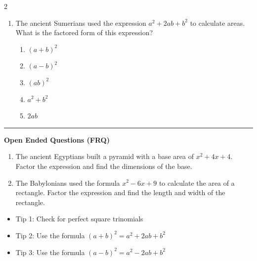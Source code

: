\documentclass[10pt]{article}
\begin{document}
\begin{multicols}{2}
\begin{enumerate}[label=\textbf{Q\arabic*.}, leftmargin=*, itemsep=6pt, parsep=0pt]
  \item \small The ancient Sumerians used the expression $a^2 + 2ab + b^2$ to calculate areas. What is the factored form of this expression?
  \begin{enumerate}[label=(\Alph*), leftmargin=0.6cm, nosep, itemsep=2pt]
    \item $(a+b)^2$
    \item $(a-b)^2$
    \item $(ab)^2$
    \item $a^2 + b^2$
    \item $2ab$
  \end{enumerate}

\end{enumerate}
\end{multicols}

\vspace{-0.2cm}
\hrule
\vspace{0.2cm}
\textbf{\small Open Ended Questions (FRQ)}
\begin{enumerate}[label=\textbf{Q\arabic*.}, start=9, itemsep=5pt, topsep=0pt]

  \item \small The ancient Egyptians built a pyramid with a base area of $x^2 + 4x + 4$. Factor the expression and find the dimensions of the base. \vspace{2cm}

  \item \small The Babylonians used the formula $x^2 - 6x + 9$ to calculate the area of a rectangle. Factor the expression and find the length and width of the rectangle. \vspace{2cm}

\end{enumerate}

\vfill

\begin{tcolorbox}[colback=blue!5, colframe=mainblue!50, title=\small \textbf{Chef's Tips}, fonttitle=\bfseries, bottom=1mm]
\begin{itemize}[noitemsep, topsep=2pt, leftmargin=0.5cm]
  \item \scriptsize Tip 1: Check for perfect square trinomials\item \scriptsize Tip 2: Use the formula $(a+b)^2 = a^2 + 2ab + b^2$\item \scriptsize Tip 3: Use the formula $(a-b)^2 = a^2 - 2ab + b^2$
\end{itemize}
\end{tcolorbox}
\end{document}
